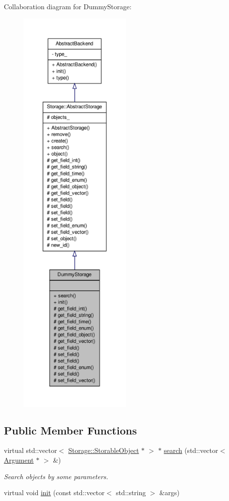 Collaboration diagram for DummyStorage:
\nopagebreak
\begin{figure}[H]
\begin{center}
\leavevmode
\includegraphics[height=600pt]{df/da0/classDummyStorage__coll__graph}
\end{center}
\end{figure}
\subsection*{Public Member Functions}
\begin{DoxyCompactItemize}
\item 
virtual std::vector$<$ \hyperlink{classStorage_1_1StorableObject}{Storage::StorableObject} $\ast$ $>$ $\ast$ \hyperlink{classDummyStorage_adea6bbcbaacaea1a728f09602d7c8d1d}{search} (std::vector$<$ \hyperlink{structStorage_1_1AbstractStorage_1_1Argument}{Argument} $\ast$ $>$ \&)
\begin{DoxyCompactList}\small\item\em Search objects by some parameters. \item\end{DoxyCompactList}\item 
virtual void \hyperlink{classDummyStorage_ac52f6e7c6941108e4686f606a4d88d6b}{init} (const std::vector$<$ std::string $>$ \&args)
\end{DoxyCompactItemize}
